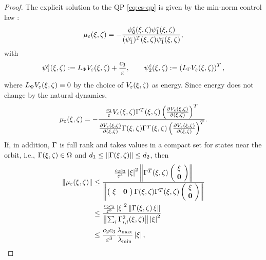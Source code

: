 \begin{proof}
  The explicit solution to the QP \eqref{eq:es-qp} is given by the min-norm
  control law \cite{Freeman1996}:
  \begin{align*}
    \mu_{\varepsilon}(\xi, \zeta) = -\frac{\psi^{\varepsilon}_{0}(\xi, \zeta)
      \psi^{\varepsilon}_{1}(\xi, \zeta)}{(\psi^{\varepsilon}_{1})^{T}(\xi, \zeta) \psi^{\varepsilon}_{1}(\xi, \zeta)},
  \end{align*}
  with
  \begin{align*}
    \psi^{\varepsilon}_{1}(\xi, \zeta) := L_{\Phi} V_{\varepsilon}(\xi, \zeta) + \frac{c_{3}}{\varepsilon},
    \qquad \psi^{\varepsilon}_{2}(\xi, \zeta) := \left( L_{\Gamma} V_{\varepsilon}(\xi, \zeta) \right)^{T},
  \end{align*}
  where $L_{\Phi} V_{\varepsilon}(\xi, \zeta) \equiv 0$ by the choice of $V_{\varepsilon}(\xi, \zeta)$ as
  energy.
  Since energy does not change by the natural dynamics,
  \begin{align*}
    \mu_{\varepsilon}(\xi, \zeta) = - \frac{\frac{c_{3}}{\varepsilon} V_{\varepsilon}(\xi, \zeta)
      \Gamma^{T}(\xi, \zeta) \left( \frac{\partial{V_{e}(\xi, \zeta)}}{\partial{(\xi, \zeta)}}
      \right)^{T}}{\frac{\partial{V_{e}(\xi, \zeta)}}{\partial{(\xi, \zeta)}} \Gamma(\xi, \zeta) \Gamma^{T}(\xi, \zeta)
      \left( \frac{\partial{V_{e}(\xi, \zeta)}}{\partial{(\xi, \zeta)}} \right)^{T}}.
  \end{align*}
  If, in addition, $\Gamma$ is full rank and takes values in a compact set for
  states near the orbit, i.e., $\Gamma(\xi, \zeta) \in \Omega$ and $d_{1} \leq \|
  \Gamma(\xi, \zeta) \| \leq d_{2}$, then
  \begin{align}
    \nonumber
    \| \mueps\argsxz \|
    &\leq \frac{\frac{c_{2}c_{3}}{\resclfparam^3} \nzdx^{2} \left\| \bigG^{T}\argsxz
        \left(\!\begin{array}{c}
            \zdx\\
            \boldzero
          \end{array}\!\right)\right\|}{\left\|
        \left(\!\begin{array}{c c}
            \zdx & \boldzero
          \end{array}\!\right) \bigG\argsxz \bigG^{T}\argsxz
        \left(\!\begin{array}{c}
            \zdx\\
            \boldzero
          \end{array}\!\right) \right\|}\\
    \nonumber
    &\leq \frac{\frac{c_{2}c_{3}}{\resclfparam^{3}} \nzdx^{2} \left\| \bigG\argsxz
        \, \zdx \right\|}{\left\|
        \sum_{i} \bigG_{i,i}^{2}\argsxz \right\| \nzdx^{2}}\\
    \label{eq:mueps-bounds}
    &\leq \frac{c_{2}c_{3}}{\resclfparam^{3}} \frac{\lambdamaxG}{\lambdaminG}
    \nzdx,

\end{align}
\end{proof}
